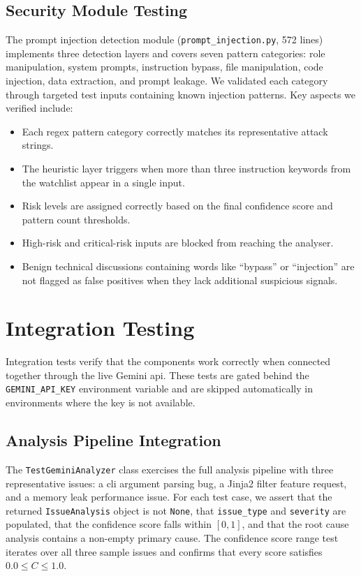 \subsection{Security Module Testing}

The prompt injection detection module (\texttt{prompt\_injection.py}, 572 lines) implements three detection layers and covers seven pattern categories: role manipulation, system prompts, instruction bypass, file manipulation, code injection, data extraction, and prompt leakage. We validated each category through targeted test inputs containing known injection patterns. Key aspects we verified include:

\begin{itemize}
\item Each regex pattern category correctly matches its representative attack strings.
\item The heuristic layer triggers when more than three instruction keywords from the watchlist appear in a single input.
\item Risk levels are assigned correctly based on the final confidence score and pattern count thresholds.
\item High-risk and critical-risk inputs are blocked from reaching the analyser.
\item Benign technical discussions containing words like ``bypass'' or ``injection'' are not flagged as false positives when they lack additional suspicious signals.
\end{itemize}

\section{Integration Testing}
\label{sec:integration}

Integration tests verify that the components work correctly when connected together through the live Gemini \gls{api}. These tests are gated behind the \texttt{GEMINI\_API\_KEY} environment variable and are skipped automatically in environments where the key is not available.

\subsection{Analysis Pipeline Integration}

The \texttt{TestGeminiAnalyzer} class exercises the full analysis pipeline with three representative issues: a \gls{cli} argument parsing bug, a Jinja2 filter feature request, and a memory leak performance issue. For each test case, we assert that the returned \texttt{IssueAnalysis} object is not \texttt{None}, that \texttt{issue\_type} and \texttt{severity} are populated, that the confidence score falls within $[0, 1]$, and that the root cause analysis contains a non-empty primary cause. The confidence score range test iterates over all three sample issues and confirms that every score satisfies $0.0 \leq C \leq 1.0$.

